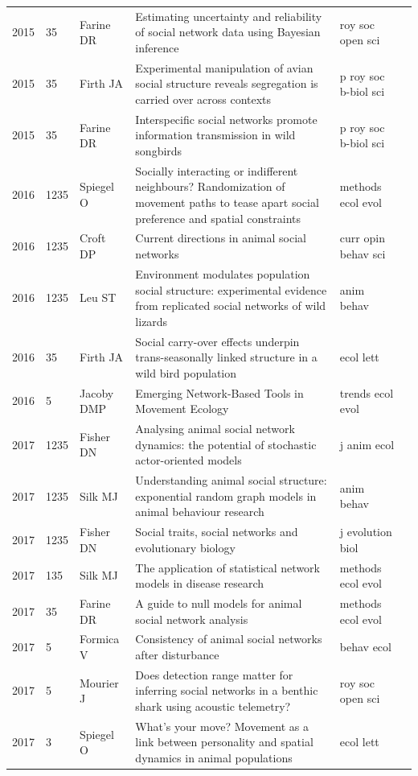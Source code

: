 \documentclass[11pt]{article} %
\begin{document}
\begin{landscape}
\begin{longtable}{p{0.7cm}|p{0.8cm}|p{3cm}|p{14.5cm}|p{3.5cm}l}
2015& 	35& 	 Farine DR& 	 Estimating uncertainty and reliability of social network data using Bayesian inference& 	 roy soc open sci\\
2015& 	35& 	 Firth JA& 	 Experimental manipulation of avian social structure reveals segregation is carried over across contexts& 	 p roy soc b-biol sci\\
2015& 	35& 	 Farine DR& 	 Interspecific social networks promote information transmission in wild songbirds& 	 p roy soc b-biol sci\\
2016& 	1235& 	 Spiegel O& 	 Socially interacting or indifferent neighbours? Randomization of movement paths to tease apart social preference and spatial constraints& 	 methods ecol evol\\
2016& 	1235& 	 Croft DP& 	 Current directions in animal social networks& 	 curr opin behav sci\\
2016& 	1235& 	 Leu ST& 	 Environment modulates population social structure: experimental evidence from replicated social networks of wild lizards& 	 anim behav\\
2016& 	35& 	 Firth JA& 	 Social carry-over effects underpin trans-seasonally linked structure in a wild bird population& 	 ecol lett\\
2016& 	5& 	 Jacoby DMP& 	 Emerging Network-Based Tools in Movement Ecology& 	 trends ecol evol\\
2017& 	1235& 	 Fisher DN& 	 Analysing animal social network dynamics: the potential of stochastic actor-oriented models& 	 j anim ecol\\
2017& 	1235& 	 Silk MJ& 	 Understanding animal social structure: exponential random graph models in animal behaviour research& 	 anim behav\\
2017& 	1235& 	 Fisher DN& 	 Social traits, social networks and evolutionary biology& 	 j evolution biol\\
2017& 	135& 	 Silk MJ& 	 The application of statistical network models in disease research& 	 methods ecol evol\\
2017& 	35& 	 Farine DR& 	 A guide to null models for animal social network analysis& 	 methods ecol evol\\
2017& 	5& 	 Formica V& 	 Consistency of animal social networks after disturbance& 	 behav ecol\\
2017& 	5& 	 Mourier J& 	 Does detection range matter for inferring social networks in a benthic shark using acoustic telemetry?& 	 roy soc open sci\\
2017& 	3& 	 Spiegel O& 	 What's your move? Movement as a link between personality and spatial dynamics in animal populations& 	 ecol lett\\

\end{longtable}
\end{landscape}
\end{document}
